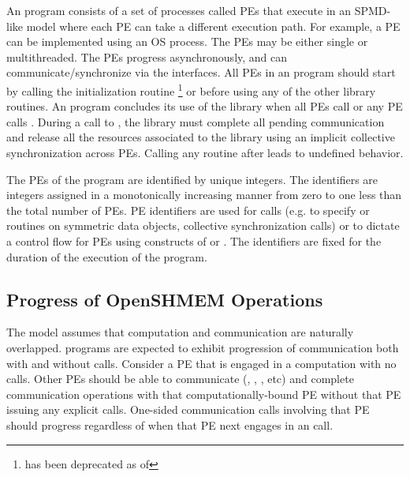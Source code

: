 An \openshmem program consists of a set of \openshmem processes called \acp{PE}
that execute in an \ac{SPMD}-like model where each \ac{PE} can take a different
execution path. For example, a \ac{PE} can be implemented using an OS
process. The \acp{PE} may be either single or multithreaded.
The \acp{PE} progress asynchronously, and can communicate/synchronize
via the \openshmem interfaces.  All \acp{PE} in an \openshmem program should
start by calling the initialization routine %
\footnote{ has been deprecated as of \openshmem[1.2]}
or  before using any of the other \openshmem library routines. 
An \openshmem program concludes its use of the \openshmem library when all \acp{PE} call
 or any \ac{PE} calls .
During a call to , the \openshmem library must
complete all pending communication and release all the resources associated to
the library using an implicit collective synchronization across \acp{PE}.
Calling any \openshmem routine after  leads to undefined
behavior.

The \acp{PE} of the \openshmem program are identified by unique integers.  The
identifiers are integers assigned in a monotonically increasing manner from zero
to one less than the total number of \acp{PE}. \ac{PE} identifiers are used for
\openshmem calls (e.g. to specify  or  routines on symmetric
data objects, collective synchronization calls) or to dictate a control flow for
\acp{PE} using constructs of \Cstd or \Fortran. The identifiers are fixed for
the duration of the execution of the \openshmem program.

\subsection{Progress of OpenSHMEM Operations}\label{subsec:progress}

The \openshmem model assumes that computation and communication are naturally
overlapped. \openshmem programs are expected to exhibit progression of
communication both with and without \openshmem calls. Consider a \ac{PE} that is
engaged in a computation with no \openshmem calls. Other \acp{PE} should be able
to communicate (, , , etc) and
complete communication operations with that computationally-bound \ac{PE}
without that \ac{PE} issuing any explicit \openshmem calls. One-sided \openshmem
communication calls involving that \ac{PE} should progress regardless of when
that \ac{PE} next engages in an \openshmem call.

